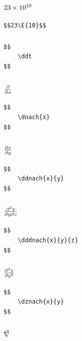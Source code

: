 \documentclass[a4paper]{article}
\begin{document}
\subsubsection{$23 \times 10^{10}$}

\begin{verbatim}
$$23\E{10}$$
\end{verbatim}

\subsubsection{\ddt}

\begin{verbatim}
$$
	\ddt
$$
\end{verbatim}

\subsubsection{$ \frac{\partial}{\partial x}$}

\begin{verbatim}
$$
	\dnach{x}
$$
\end{verbatim}

\subsubsection{$ \frac{\partial x}{\partial y}$}

\begin{verbatim}
$$
	\ddnach{x}{y}
$$
\end{verbatim}


\subsubsection{$ \frac{\partial^2 x}{\partial y \partial z}$}

\begin{verbatim}
$$
	\dddnach{x}{y}{z}
$$
\end{verbatim}

\subsubsection{$ \frac{\partial^2 x}{\partial y^2}$}

\begin{verbatim}
$$
	\dznach{x}{y}
$$
\end{verbatim}

\subsubsection{$ \vec{\nabla}$}
\end{document}
